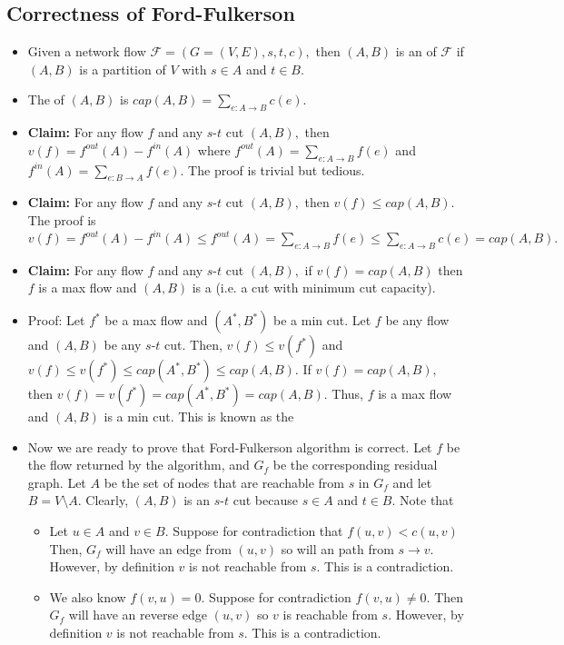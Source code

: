 \documentclass[a4paper,12pt]{article}
\begin{document}
\subsection{Correctness of Ford-Fulkerson}
\begin{itemize}
    \item Given a network flow $\mathcal F=(G=(V,E),s,t,c),$ then $(A,B)$ is an  of $\mathcal F$ if $(A,B)$ is a partition of $V$ with $s\in A$ and $t\in B.$
    \item The  of $(A,B)$ is $cap(A,B)=\sum_{e:A\to B}c(e).$
    \item \textbf{Claim:} For any flow $f$ and any $s$-$t$ cut $(A,B),$ then $v(f)=f^{out}(A)-f^{in}(A)$ where $f^{out}(A)=\sum_{e:A\to B}f(e)$ and $f^{in}(A)=\sum_{e:B\to A}f(e).$ The proof is trivial but tedious.
    \item \textbf{Claim:} For any flow $f$ and any $s$-$t$ cut $(A,B),$ then $v(f)\leq cap(A,B).$ The proof is $v(f)=f^{out}(A)-f^{in}(A)\leq f^{out}(A)=\sum_{e:A\to B}f(e)\leq\sum_{e:A\to B}c(e)=cap(A,B).$
    \item \textbf{Claim:} For any flow $f$ and any $s$-$t$ cut $(A,B),$ if $v(f)=cap(A,B)$ then $f$ is a max flow and $(A,B)$ is a  (i.e. a cut with minimum cut capacity).
    \item Proof: Let $f^*$ be a max flow and $(A^*,B^*)$ be a min cut. Let $f$ be any flow and $(A,B)$ be any $s$-$t$ cut. Then, $v(f)\leq v(f^*)$ and $v(f)\leq v(f^*)\leq cap(A^*,B^*)\leq cap(A,B).$ If $v(f)=cap(A,B),$ then $v(f)=v(f^*)=cap(A^*,B^*)=cap(A,B).$ Thus, $f$ is a max flow and $(A,B)$ is a min cut. This is known as the 
    \item Now we are ready to prove that Ford-Fulkerson algorithm is correct. Let $f$ be the flow returned by the algorithm, and $G_f$ be the corresponding residual graph. Let $A$ be the set of nodes that are reachable from $s$ in $G_f$ and let $B=V\setminus A.$ Clearly, $(A,B)$ is an $s$-$t$ cut because $s\in A$ and $t\in B.$ Note that \begin{itemize}
        \item Let $u\in A$ and $v\in B.$ Suppose for contradiction that $f(u,v)<c(u,v)$ Then, $G_f$ will have an edge from $(u,v)$ so will an path from $s\to v.$ However, by definition $v$ is not reachable from $s$. This is a contradiction.
        \item We also know $f(v,u)=0.$ Suppose for contradiction $f(v,u)\neq 0.$ Then $G_f$ will have an reverse edge $(u,v)$ so $v$ is reachable from $s.$ However, by definition $v$ is not reachable from $s$. This is a contradiction.

\end{itemize}
\end{itemize}
\end{document}

